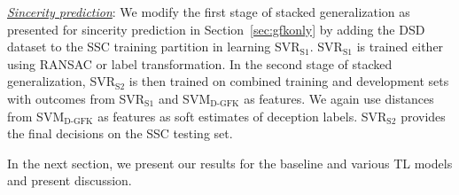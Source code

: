 \documentclass{article}
\begin{document}
\begin{spacing}{0.89}
\underline{\it Sincerity prediction}:
We modify the first stage of stacked generalization as presented for sincerity prediction in Section~\ref{sec:gfkonly} by adding the DSD dataset to the SSC training partition in learning SVR$_\text{S1}$.
SVR$_\text{S1}$ is trained either using RANSAC or label transformation. 
In the second stage of stacked generalization, SVR$_\text{S2}$ is then trained on combined training and development sets with outcomes from SVR$_\text{S1}$ and SVM$_\text{D-GFK}$ as features.
We again use distances from SVM$_\text{D-GFK}$ as features as soft estimates of deception labels. 
SVR$_\text{S2}$ provides the final decisions on the SSC testing set.

In the next section, we present our results for the baseline and various TL models and present discussion.


\end{spacing}
\end{document}
